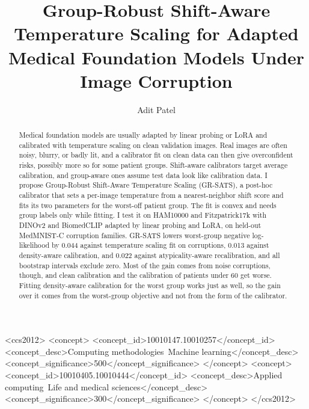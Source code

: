 \documentclass[sigconf,nonacm]{acmart}
\begin{document}
\title{Group-Robust Shift-Aware Temperature Scaling for Adapted Medical
  Foundation Models Under Image Corruption}

\author{Adit Patel}

\renewcommand{\shortauthors}{Patel}

\begin{abstract}
Medical foundation models are usually adapted by linear probing or LoRA and
calibrated with temperature scaling on clean validation images. Real images
are often noisy, blurry, or badly lit, and a calibrator fit on clean data can
then give overconfident risks, possibly more so for some patient groups.
Shift-aware calibrators target average calibration, and group-aware ones
assume test data look like calibration data. I propose Group-Robust
Shift-Aware Temperature Scaling (GR-SATS), a post-hoc calibrator that sets a
per-image temperature from a nearest-neighbor shift score and fits its two
parameters for the worst-off patient group. The fit is convex and needs group
labels only while fitting. I test it on HAM10000 and Fitzpatrick17k with
DINOv2 and BiomedCLIP adapted by linear probing and LoRA, on held-out
MedMNIST-C corruption families. GR-SATS lowers worst-group negative
log-likelihood by 0.044 against temperature scaling fit on corruptions, 0.013
against density-aware calibration, and 0.022 against atypicality-aware
recalibration, and all bootstrap intervals exclude zero. Most of the gain
comes from noise corruptions, though, and clean calibration and the
calibration of patients under 60 get worse. Fitting density-aware calibration
for the worst group works just as well, so the gain over it comes from the
worst-group objective and not from the form of the calibrator.
\end{abstract}

\begin{CCSXML}
<ccs2012>
 <concept>
  <concept_id>10010147.10010257</concept_id>
  <concept_desc>Computing methodologies~Machine learning</concept_desc>
  <concept_significance>500</concept_significance>
 </concept>
 <concept>
  <concept_id>10010405.10010444</concept_id>
  <concept_desc>Applied computing~Life and medical sciences</concept_desc>
  <concept_significance>300</concept_significance>
 </concept>
</ccs2012>
\end{CCSXML}
\end{document}
